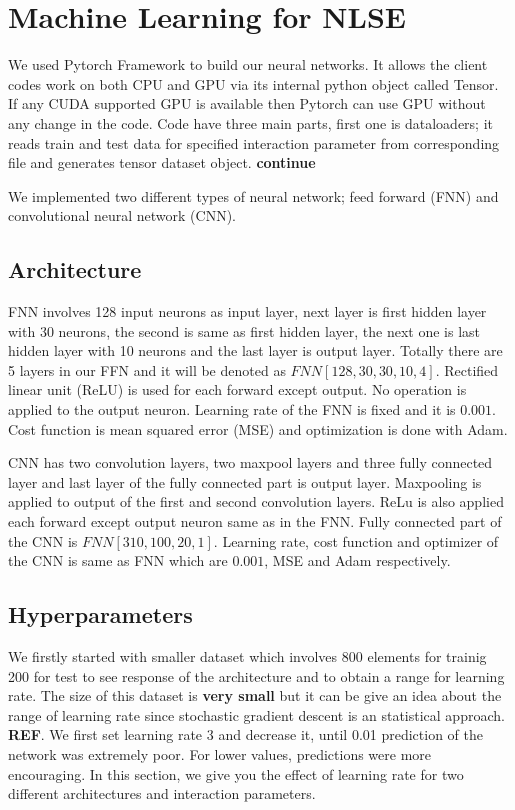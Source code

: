 \documentclass[a4paper,times,12pt]{article}
\begin{document}
\section{Machine Learning for NLSE}

We used Pytorch Framework to build our neural networks. It allows the client codes work on both CPU and GPU via its internal python object called Tensor. If any CUDA supported GPU is available then Pytorch can use GPU without any change in the code. Code have three main parts, first one is dataloaders; it reads train and test data for specified interaction parameter from corresponding file and generates tensor dataset object. \textbf{continue}

We implemented two different types of neural network; feed forward (FNN) and convolutional neural network (CNN).


\subsection{Architecture}

FNN involves 128 input neurons as input layer, next layer is first hidden layer with 30 neurons, the second is same as first hidden layer, the next one is last hidden layer with 10 neurons and the last layer is output layer. Totally there are 5 layers in our FFN and it will be denoted as $FNN[128, 30, 30, 10, 4]$. Rectified linear unit (ReLU) is used for each forward except output. No operation is applied to the output neuron. Learning rate of the FNN is fixed and it is $0.001$. Cost function is mean squared error (MSE) and optimization is done with Adam. 


CNN has two convolution layers, two maxpool layers and three fully connected layer and last layer of the fully connected part is output layer. Maxpooling is applied to output of the first and second convolution layers. ReLu is also applied each forward except output neuron same as in the FNN. Fully connected part of the CNN is $FNN[310, 100, 20, 1]$. Learning rate, cost function and optimizer of the CNN is same as FNN which are $0.001$, MSE and Adam respectively.


\subsection{Hyperparameters}

We firstly started with smaller dataset which involves 800 elements for trainig 200 for test to see response of the architecture and to obtain a range for learning rate. The size of this dataset is \textbf{very small} but it can be give an idea about the range of learning rate since stochastic gradient descent is an statistical approach. \textbf{REF}. We first set learning rate 3 and decrease it, until 0.01 prediction of the network was extremely poor. For lower values, predictions were more encouraging. In this section, we give you the effect of learning rate for two different architectures and interaction parameters. 
\end{document}
